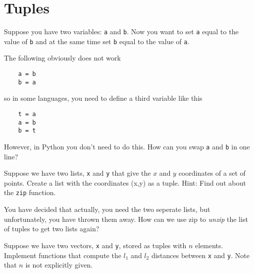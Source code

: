 \section{Tuples} %
\label{sec:tuples}
\begin{questions}
\label{sub:swapping_two_values}

Suppose you have two variables: \texttt{a} and \texttt{b}.
Now you want to set \texttt{a} equal to the value of \texttt{b} and at
 the same time set \texttt{b} equal to the value of \texttt{a}.

The following obviously does not work
\begin{verbatim}
    a = b
    b = a
\end{verbatim}
so in some languages, you need to define a third variable like this
\begin{verbatim}
    t = a
    a = b
    b = t
\end{verbatim}
However, in Python you don't need to do this. How can you swap \texttt{a} and
\texttt{b} in one line?


\label{sub:zip}

Suppose we have two lists, \texttt{x} and \texttt{y} that give the $x$ and $y$
coordinates of a set of points. Create a list with the coordinates (x,y) as a tuple.
Hint: Find out about the \texttt{zip} function.

You have decided that actually, you need the two seperate lists, but unfortunately,
you have thrown them away.
How can we use zip to \emph{unzip} the list of tuples to get two lists again?


\label{sub:zip}

Suppose we have two vectors, \texttt{x} and \texttt{y}, stored as tuples with $n$ elements.
Implement functions that compute the $l_1$ and $l_2$ distances between \texttt{x} and \texttt{y}.
Note that $n$ is not explicitly given.

\end{questions}
